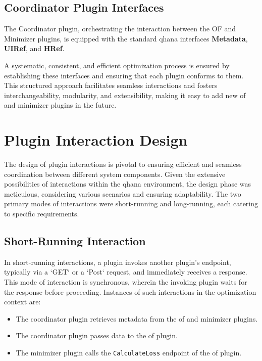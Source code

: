\documentclass[
  a4paper,  %
  twoside,  %
  bibliography=totoc,
  headsepline,
  cleardoublepage=empty,
  parskip=half,
  draft=false
]{scrbook}
\begin{document}
\subsection{Coordinator Plugin Interfaces}

The Coordinator plugin, orchestrating the interaction between the OF and Minimizer plugins, is equipped with the standard \gls{qhana} interfaces \textbf{Metadata}, \textbf{UIRef}, and \textbf{HRef}.

A systematic, consistent, and efficient optimization process is ensured by establishing these interfaces and ensuring that each plugin conforms to them.
This structured approach facilitates seamless interactions and fosters interchangeability, modularity, and extensibility, making it easy to add new \gls{of} and minimizer plugins in the future.

\section{Plugin Interaction Design}

The design of plugin interactions is pivotal to ensuring efficient and seamless coordination between different system components.
Given the extensive possibilities of interactions within the \gls{qhana} environment, the design phase was meticulous, considering various scenarios and ensuring adaptability.
The two primary modes of interactions were short-running and long-running, each catering to specific requirements.

\subsection{Short-Running Interaction}

In short-running interactions, a plugin invokes another plugin's endpoint, typically via a `GET` or a `Post` request, and immediately receives a response.
This mode of interaction is synchronous, wherein the invoking plugin waits for the response before proceeding.
Instances of such interactions in the optimization context are:
\begin{itemize}
    \item The coordinator plugin retrieves metadata from the \gls{of} and minimizer plugins.
    \item The coordinator plugin passes data to the \gls{of} plugin.
    \item The minimizer plugin calls the \texttt{CalculateLoss} endpoint of the \gls{of} plugin.
\end{itemize}
\end{document}
